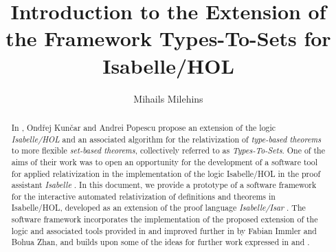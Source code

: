 \documentclass[11pt,a4paper,fleqn]{report}
\begin{document}
\sloppy

\title{
Introduction to the Extension of the Framework 
Types-To-Sets for Isabelle/HOL
} 
\author{Mihails Milehins}
\maketitle

\newpage

\begin{abstract}
In \cite{blanchette_types_2016, kuncar_types_2019}, 
Ondřej Kunčar and Andrei Popescu propose an 
extension of the logic \textit{Isabelle/HOL} and an associated algorithm for the 
relativization of \textit{type-based theorems} to more flexible 
\textit{set-based theorems}, collectively referred to as 
\textit{Types-To-Sets}. One of the aims of their work was to open an 
opportunity for the development of a 
software tool for applied relativization  
in the implementation of the logic 
Isabelle/HOL in the proof assistant \textit{Isabelle}
\cite{paulson_natural_1986}. In this document, 
we provide a prototype of a software framework for the interactive 
automated relativization 
of definitions and theorems in Isabelle/HOL, developed as an extension of 
the proof language \textit{Isabelle/Isar}  
\cite{bertot_isar_1999,wenzel_isabelleisar_2007}.
The software framework incorporates the implementation of the 
proposed extension of the logic and associated tools provided in 
\cite{blanchette_types_2016} and improved further in \cite{immler_smooth_2019} 
by Fabian Immler and Bohua Zhan, and builds upon 
some of the ideas for further work expressed in \cite{immler_smooth_2019}
and \cite{kuncar_types_2019}.
\end{abstract}

\newpage
\end{document}
